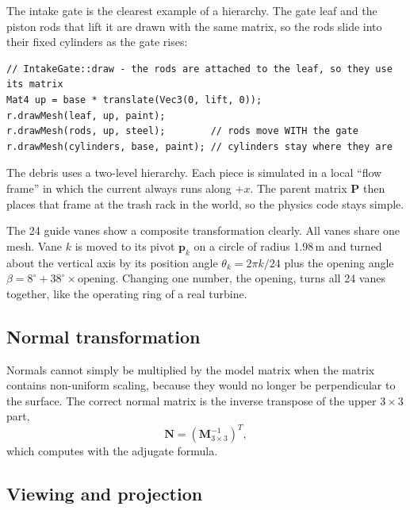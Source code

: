 \documentclass[11pt,a4paper]{report}
\newcommand{\code}[1]{\texttt{\detokenize{#1}}}
\newcommand{\vect}[1]{\mathbf{#1}}
\newcommand{\mat}[1]{\mathbf{#1}}
\begin{document}
The intake gate is the clearest example of a hierarchy. The gate leaf and the piston
rods that lift it are drawn with the same matrix, so the rods slide into their fixed
cylinders as the gate rises:

\begin{lstlisting}
// IntakeGate::draw - the rods are attached to the leaf, so they use its matrix
Mat4 up = base * translate(Vec3(0, lift, 0));
r.drawMesh(leaf, up, paint);
r.drawMesh(rods, up, steel);        // rods move WITH the gate
r.drawMesh(cylinders, base, paint); // cylinders stay where they are
\end{lstlisting}

The debris uses a two-level hierarchy. Each piece is simulated in a local ``flow
frame'' in which the current always runs along $+x$. The parent matrix $\mat{P}$ then
places that frame at the trash rack in the world, so the physics code stays simple.

The 24 guide vanes show a composite transformation clearly. All vanes share one mesh.
Vane $k$ is moved to its pivot $\vect{p}_k$ on a circle of radius 1.98\,m and turned
about the vertical axis by its position angle $\theta_k = 2\pi k/24$ plus the opening
angle $\beta = 8^\circ + 38^\circ\times\text{opening}$. Changing one number, the
opening, turns all 24 vanes together, like the operating ring of a real turbine.

\subsection{Normal transformation}

Normals cannot simply be multiplied by the model matrix when the matrix contains
non-uniform scaling, because they would no longer be perpendicular to the surface.
The correct normal matrix is the inverse transpose of the upper $3\times3$ part,
\begin{equation}
\mat{N} = \left(\mat{M}_{3\times3}^{-1}\right)^{T},
\end{equation}
which \code{normalMatrix} computes with the adjugate formula.

\subsection{Viewing and projection}
\end{document}
